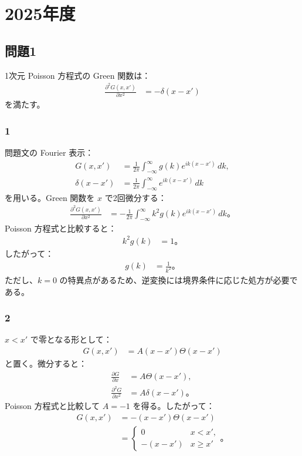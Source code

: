 \documentclass[platex,dvipdfmx,a4paper]{jsarticle}
\newcommand{\hb}[2]{\frac{\partial #1}{\partial #2}}
\newcommand{\nhb}[3]{\frac{\partial^{#1} #2}{\partial #3^{#1}}}
\begin{document}
\section*{2025年度}

\subsection*{問題1}

1次元 Poisson 方程式の Green 関数は：
\begin{align*}
  \nhb{2}{G(x,x')}{x}
  &=-\delta(x-x')
\end{align*}
を満たす。

\subsubsection*{1}

問題文の Fourier 表示：
\begin{align*}
  G(x,x')
  &=\frac{1}{2\pi}\int_{-\infty}^{\infty}g(k)e^{ik(x-x')}\,dk,\\
  \delta(x-x')
  &=\frac{1}{2\pi}\int_{-\infty}^{\infty}e^{ik(x-x')}\,dk
\end{align*}
を用いる。Green 関数を $x$ で2回微分する：
\begin{align*}
  \nhb{2}{G(x,x')}{x}
  &=-\frac{1}{2\pi}\int_{-\infty}^{\infty}k^2g(k)e^{ik(x-x')}\,dk。
\end{align*}
Poisson 方程式と比較すると：
\begin{align*}
  k^2g(k)&=1。
\end{align*}
したがって：
\begin{align*}
  g(k)&=\frac{1}{k^2}。
\end{align*}
ただし、$k=0$ の特異点があるため、逆変換には境界条件に応じた処方が必要である。

\subsubsection*{2}

$x<x'$ で零となる形として：
\begin{align*}
  G(x,x')
  &=A(x-x')\Theta(x-x')
\end{align*}
と置く。微分すると：
\begin{align*}
  \hb{G}{x}
  &=A\Theta(x-x'),\\
  \nhb{2}{G}{x}
  &=A\delta(x-x')。
\end{align*}
Poisson 方程式と比較して $A=-1$ を得る。したがって：
\begin{align*}
  G(x,x')
  &=-(x-x')\Theta(x-x') \\
  &=\begin{cases}
    0 & x<x',\\
    -(x-x') & x\geq x'
  \end{cases}。
\end{align*}
\end{document}
